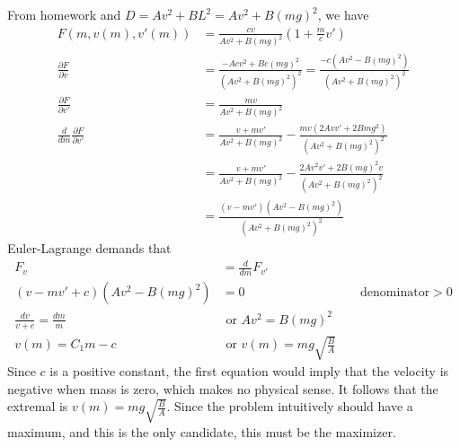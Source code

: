 \documentclass[12pt]{article}
\begin{document}
\begin{problem}[2]
From homework and $ D=Av^2+BL^2 = Av^2+ B(mg)^2$, we have
\begin{align*}
	F(m,v(m),v'(m))&= \frac{c v}{ Av^2+B(mg)^2} \left( 1+\frac{m}{c} v' \right) \\
	\frac{\partial F}{\partial v} &= \frac{-Acv^2+Bc(mg)^2}{(Av^2+B(mg)^2)^2 } = \frac{-c(Av^2-B(mg)^2)}{(Av^2+B(mg)^2)^2 }\\
	\frac{\partial F}{\partial v'} &= \frac{mv}{Av^2+B(mg)^2} \\
	\frac{d}{dm} \frac{\partial F}{\partial v'} &= \frac{v+mv'}{ Av^2+ B(mg)^2} -\frac{mv(2Avv'+2Bmg^2)}{ (Av^2+B(mg)^2)^2} \\
	&= \frac{v+mv'}{ Av^2+ B(mg)^2} - \frac{2Av^2v'+2B(mg)^2v}{(A v^2+B(mg)^2)^2 } \\
	&= \frac{(v-mv')(Av^2-B(mg)^2)}{(Av^2+B(mg)^2)^2 } 
\end{align*}
Euler-Lagrange demands that
\begin{align*}
	F_v &= \frac{d}{dm} F_{v'}\\
	(v-mv'+c)(Av^2-B(mg)^2) &= 0 && \text{ denominator}>0 \\
	\frac{dv}{v+c} = \frac{dm}{m} &\text{ or } Av^2=B(mg)^2\\ 
	v(m)=C_1m-c &\text{ or } v(m) = mg \sqrt{\frac{B}{A}}  
\end{align*}
Since $ c$ is a positive constant, the first equation would imply that the velocity is negative when mass is zero, which makes no physical sense. It follows that the extremal is $ v(m) = mg \sqrt{\frac{B}{A}} $. Since the problem intuitively should have a maximum, and this is the only candidate, this must be the maximizer.

\end{problem}
\end{document}
